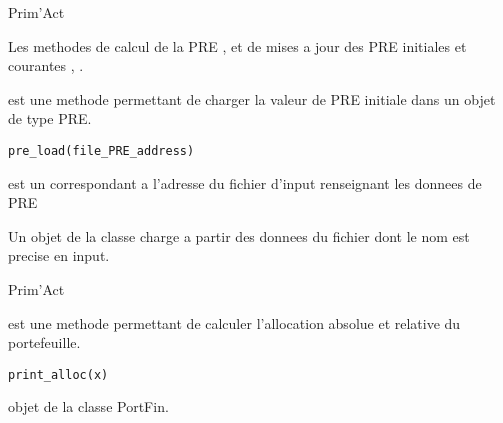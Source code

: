 \documentclass[a4paper]{book}
\begin{document}
%
\begin{Author}\relax
Prim'Act
\end{Author}
%
\begin{SeeAlso}\relax
Les methodes de calcul de la PRE , et de mises a jour des PRE initiales et courantes , .
\end{SeeAlso}
%
\begin{Description}\relax
{} est une methode permettant de charger la valeur de PRE initiale dans un objet de type PRE.
\end{Description}
%
\begin{Usage}
\begin{verbatim}
pre_load(file_PRE_address)
\end{verbatim}
\end{Usage}
%
\begin{Arguments}
\begin{ldescription}
\item[\code{file\_PRE\_address}] est un  correspondant a l'adresse du fichier d'input renseignant les donnees de PRE
\end{ldescription}
\end{Arguments}
%
\begin{Value}
Un objet de la classe  charge a partir des donnees du fichier dont le nom est precise en input.
\end{Value}
%
\begin{Author}\relax
Prim'Act
\end{Author}
%
\begin{Description}\relax
{} est une methode permettant de calculer l'allocation absolue et relative du portefeuille.
\end{Description}
%
\begin{Usage}
\begin{verbatim}
print_alloc(x)
\end{verbatim}
\end{Usage}
%
\begin{Arguments}
\begin{ldescription}
\item[\code{x}] objet de la classe PortFin.
\end{ldescription}
\end{Arguments}
\end{document}
